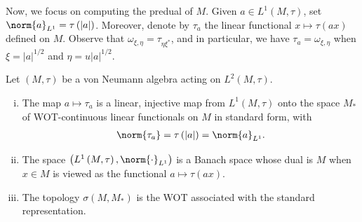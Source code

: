 \documentclass[10pt]{mypackage}
\begin{document}
Now, we focus on computing the predual of $M$. Given $a\in L^1\left( M,\tau \right)$, set $\norm{a}_{L^1} = \tau\left( \left\vert a \right\vert \right)$. Moreover, denote by $\tau_a$ the linear functional $x\mapsto \tau\left( ax \right)$ defined on $M$. Observe that $\omega_{\xi,\eta} = \tau_{\eta\xi^{\ast}}$, and in particular, we have $\tau_{a} = \omega_{\xi,\eta}$ when $\xi = \left\vert a \right\vert^{1/2}$ and $\eta = u \left\vert a \right\vert^{1/2}$.
\begin{theorem}
  Let $\left( M,\tau \right)$ be a von Neumann algebra acting on $L^2\left( M,\tau \right)$.
  \begin{enumerate}[(i)]
    \item The map $a\mapsto \tau_a$ is a linear, injective map from $L^1\left( M,\tau \right)$ onto the space $M_{\ast}$ of WOT-continuous linear functionals on $M$ in standard form, with
      \begin{align*}
        \norm{\tau_a} = \tau\left( \left\vert a \right\vert \right) = \norm{a}_{L^1}.
      \end{align*}
    \item The space $\left( L^1\left( M,\tau \right),\norm{\cdot}_{L^1} \right)$ is a Banach space whose dual is $M$ when $x\in M$ is viewed as the functional $a\mapsto \tau\left( ax \right)$.
    \item The topology $\sigma\left( M,M_{\ast} \right)$ is the WOT associated with the standard representation.
  \end{enumerate}
\end{theorem}
\end{document}
